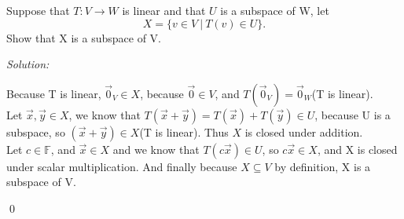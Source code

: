 \documentclass[11 pt]{article}
\newenvironment{problem}[2][Problem]{\begin{trivlist}
\item[\hskip \labelsep {\bfseries #1}\hskip \labelsep {\bfseries #2.}]}{\end{trivlist}}
\newenvironment{sol}
    {\emph{Solution:}
    }
    {
    \qed
    }
\newcommand{\F}{\mathbb{F}} %
\begin{document}
\begin{problem}{2.5.18}
Suppose that $T: V\to W$ is linear and that $U$ is a subspace of W, let
\[X=\{v\in V\ |\ T(v)\in U\}.\]
Show that X is a subspace of V.
\end{problem}
\begin{sol}
Because T is linear, $\vec{0}_V\in X$, because $\vec{0}\in V$, and $T(\vec{0}_V)=\vec{0}_W$(T is linear).\\
Let $\vec{x},\vec{y}\in X$, we know that $T(\vec{x}+\vec{y})=T(\vec{x})+T(\vec{y})\in U$, because U is a subspace, so $(\vec{x}+\vec{y})\in X$(T is linear). Thus $X$ is closed under addition.\\
Let $c\in\F$, and $\vec{x}\in X$ and we know that $T(c\vec{x})\in U$, so $c\vec{x}\in X$, and X is closed under scalar multiplication. And finally because $X\subseteq V$ by definition, X is a subspace of V.
\end{sol}
\end{document}
